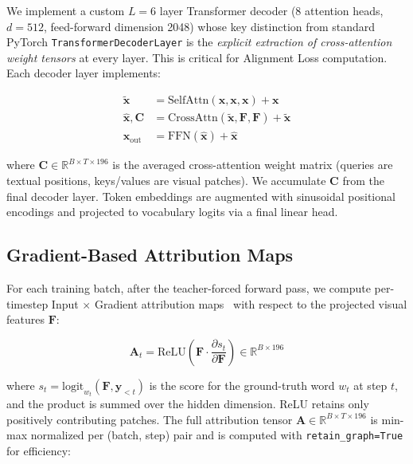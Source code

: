 \documentclass[conference]{IEEEtran}
\begin{document}
We implement a custom $L=6$ layer Transformer decoder (8 attention heads, $d=512$, feed-forward dimension 2048) whose key distinction from standard PyTorch \texttt{TransformerDecoderLayer} is the \textit{explicit extraction of cross-attention weight tensors} at every layer. This is critical for Alignment Loss computation. Each decoder layer implements:

\begin{align}
    \tilde{\mathbf{x}} &= \text{SelfAttn}(\mathbf{x}, \mathbf{x}, \mathbf{x}) + \mathbf{x} \label{eq:selfattn}\\
    \hat{\mathbf{x}}, \mathbf{C} &= \text{CrossAttn}(\tilde{\mathbf{x}}, \mathbf{F}, \mathbf{F}) + \tilde{\mathbf{x}} \label{eq:crossattn}\\
    \mathbf{x}_{\text{out}} &= \text{FFN}(\hat{\mathbf{x}}) + \hat{\mathbf{x}} \label{eq:ffn}
\end{align}

where $\mathbf{C} \in \mathbb{R}^{B \times T \times 196}$ is the averaged cross-attention weight matrix (queries are textual positions, keys/values are visual patches). We accumulate $\mathbf{C}$ from the final decoder layer. Token embeddings are augmented with sinusoidal positional encodings and projected to vocabulary logits via a final linear head.

\subsection{Gradient-Based Attribution Maps}

For each training batch, after the teacher-forced forward pass, we compute per-timestep Input $\times$ Gradient attribution maps~\cite{b9} with respect to the projected visual features $\mathbf{F}$:

\begin{equation}
    \mathbf{A}_t = \text{ReLU}\!\left(\mathbf{F} \cdot \frac{\partial s_t}{\partial \mathbf{F}}\right) \in \mathbb{R}^{B \times 196}
    \label{eq:attr}
\end{equation}

where $s_t = \text{logit}_{w_t}(\mathbf{F}, \mathbf{y}_{<t})$ is the score for the ground-truth word $w_t$ at step $t$, and the product is summed over the hidden dimension. ReLU retains only positively contributing patches. The full attribution tensor $\mathbf{A} \in \mathbb{R}^{B \times T \times 196}$ is min-max normalized per (batch, step) pair and is computed with \texttt{retain\_graph=True} for efficiency:
\end{document}
